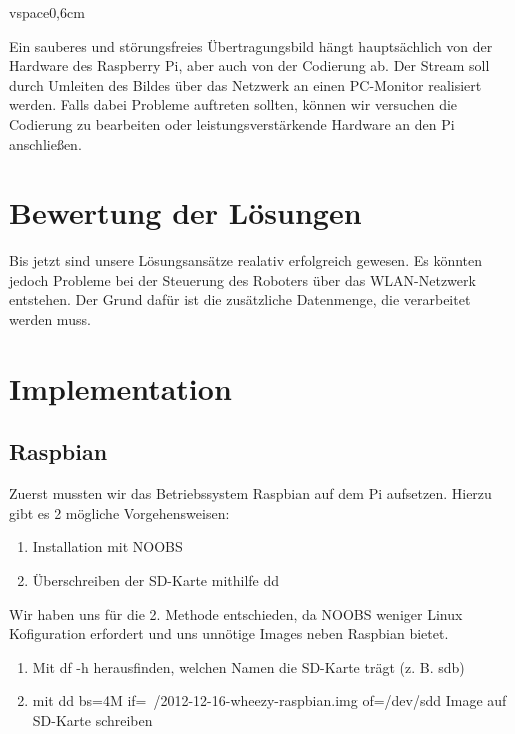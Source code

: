 \documentclass[12pt]{article}
\begin{document}
vspace{0,6cm}

Ein sauberes und störungsfreies Übertragungsbild hängt hauptsächlich von der Hardware des Raspberry Pi, aber auch von der Codierung ab. Der Stream soll durch  Umleiten des Bildes über das Netzwerk an einen PC-Monitor realisiert werden. Falls dabei Probleme auftreten sollten, können wir versuchen die Codierung zu bearbeiten oder leistungsverstärkende Hardware an den Pi anschließen.




\section{Bewertung der Lösungen}

Bis jetzt sind unsere Lösungsansätze realativ erfolgreich gewesen. Es könnten jedoch Probleme bei der Steuerung des Roboters über das WLAN-Netzwerk entstehen. Der Grund dafür ist die zusätzliche Datenmenge, die verarbeitet werden muss. 

\section{Implementation}


\subsection{Raspbian}

Zuerst mussten wir das Betriebssystem Raspbian auf dem Pi aufsetzen.
Hierzu gibt es 2 mögliche Vorgehensweisen:
\begin{enumerate}
\item Installation mit NOOBS
\item Überschreiben der SD-Karte mithilfe dd
\end{enumerate}

Wir haben uns für die 2. Methode entschieden, da NOOBS weniger Linux Kofiguration erfordert und uns unnötige Images neben Raspbian bietet.
\begin{enumerate}
\item Mit df -h herausfinden, welchen Namen die SD-Karte trägt (z. B. sdb)
\item mit dd bs=4M if=~/2012-12-16-wheezy-raspbian.img of=/dev/sdd Image auf SD-Karte schreiben
\end{enumerate}
\end{document}
